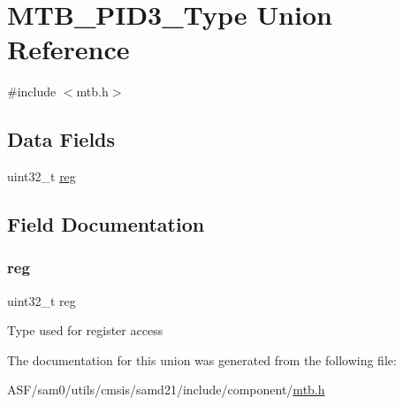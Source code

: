\hypertarget{union_m_t_b___p_i_d3___type}{}\section{M\+T\+B\+\_\+\+P\+I\+D3\+\_\+\+Type Union Reference}
\label{union_m_t_b___p_i_d3___type}


{\ttfamily \#include $<$mtb.\+h$>$}

\subsection*{Data Fields}
\begin{DoxyCompactItemize}
\item 
uint32\+\_\+t \mbox{\hyperlink{union_m_t_b___p_i_d3___type_a6b91636401516a477989a336376d7b40}{reg}}
\end{DoxyCompactItemize}


\subsection{Field Documentation}
\mbox{\label{union_m_t_b___p_i_d3___type_a6b91636401516a477989a336376d7b40}} 
\subsubsection{\texorpdfstring{reg}{reg}}
{\footnotesize\ttfamily uint32\+\_\+t reg}

Type used for register access 

The documentation for this union was generated from the following file\+:\begin{DoxyCompactItemize}
\item 
A\+S\+F/sam0/utils/cmsis/samd21/include/component/\mbox{\hyperlink{component_2mtb_8h}{mtb.\+h}}\end{DoxyCompactItemize}
